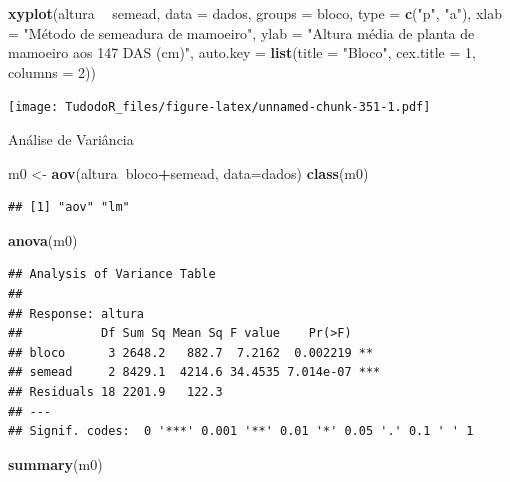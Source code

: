 \documentclass[
]{book}
\newenvironment{Shaded}{\begin{snugshade}}{\end{snugshade}}
\newcommand{\DataTypeTok}[1]{\textcolor[rgb]{0.13,0.29,0.53}{#1}}
\newcommand{\DecValTok}[1]{\textcolor[rgb]{0.00,0.00,0.81}{#1}}
\newcommand{\KeywordTok}[1]{\textcolor[rgb]{0.13,0.29,0.53}{\textbf{#1}}}
\newcommand{\NormalTok}[1]{#1}
\newcommand{\OperatorTok}[1]{\textcolor[rgb]{0.81,0.36,0.00}{\textbf{#1}}}
\newcommand{\StringTok}[1]{\textcolor[rgb]{0.31,0.60,0.02}{#1}}
\begin{document}
\begin{Shaded}
\begin{Highlighting}[]
\KeywordTok{xyplot}\NormalTok{(altura }\OperatorTok{~}\StringTok{ }\NormalTok{semead, }\DataTypeTok{data =}\NormalTok{ dados,}
  \DataTypeTok{groups =}\NormalTok{ bloco, }\DataTypeTok{type =} \KeywordTok{c}\NormalTok{(}\StringTok{"p"}\NormalTok{, }\StringTok{"a"}\NormalTok{),}
  \DataTypeTok{xlab =} \StringTok{"Método de semeadura de mamoeiro"}\NormalTok{,}
  \DataTypeTok{ylab =} \StringTok{"Altura média de planta de mamoeiro aos 147 DAS (cm)"}\NormalTok{,}
  \DataTypeTok{auto.key =} \KeywordTok{list}\NormalTok{(}\DataTypeTok{title =} \StringTok{"Bloco"}\NormalTok{, }\DataTypeTok{cex.title =} \DecValTok{1}\NormalTok{, }\DataTypeTok{columns =} \DecValTok{2}\NormalTok{))}
\end{Highlighting}
\end{Shaded}

\texttt{[image: TudodoR\_files/figure-latex/unnamed-chunk-351-1.pdf]}

Análise de Variância

\begin{Shaded}
\begin{Highlighting}[]
\NormalTok{m0 <-}\StringTok{ }\KeywordTok{aov}\NormalTok{(altura}\OperatorTok{~}\NormalTok{bloco}\OperatorTok{+}\NormalTok{semead, }\DataTypeTok{data=}\NormalTok{dados)}
\KeywordTok{class}\NormalTok{(m0)}
\end{Highlighting}
\end{Shaded}

\begin{verbatim}
## [1] "aov" "lm"
\end{verbatim}

\begin{Shaded}
\begin{Highlighting}[]
\KeywordTok{anova}\NormalTok{(m0)}
\end{Highlighting}
\end{Shaded}

\begin{verbatim}
## Analysis of Variance Table
## 
## Response: altura
##           Df Sum Sq Mean Sq F value    Pr(>F)    
## bloco      3 2648.2   882.7  7.2162  0.002219 ** 
## semead     2 8429.1  4214.6 34.4535 7.014e-07 ***
## Residuals 18 2201.9   122.3                      
## ---
## Signif. codes:  0 '***' 0.001 '**' 0.01 '*' 0.05 '.' 0.1 ' ' 1
\end{verbatim}

\begin{Shaded}
\begin{Highlighting}[]
\KeywordTok{summary}\NormalTok{(m0)}
\end{Highlighting}
\end{Shaded}
\end{document}

